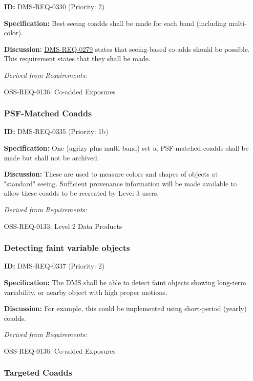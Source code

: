 \documentclass[SE,toc,lsstdraft]{lsstdoc}
\begin{document}
\label{DMS-REQ-0330}
\textbf{ID:} DMS-REQ-0330 (Priority: 2)

\textbf{Specification:} Best seeing coadds shall be made for each band (including multi-color).

\textbf{Discussion:} \hyperref[DMS-REQ-0279]{DMS-REQ-0279} states that seeing-based co-adds should be possible. This requirement states that they shall be made.

\emph{Derived from Requirements:}

OSS-REQ-0136:
Co-added Exposures \newline

\subsubsection{PSF-Matched Coadds}

\label{DMS-REQ-0335}
\textbf{ID:} DMS-REQ-0335 (Priority: 1b)

\textbf{Specification:} One (ugrizy plus multi-band) set of PSF-matched coadds shall be made but shall not be archived.

\textbf{Discussion:} These are used to measure colors and shapes of objects at "standard" seeing. Sufficient provenance information will be made available to allow these coadds to be recreated by Level 3 users.

\emph{Derived from Requirements:}

OSS-REQ-0133:
Level 2 Data Products \newline

\subsubsection{Detecting faint variable objects}

\label{DMS-REQ-0337}
\textbf{ID:} DMS-REQ-0337 (Priority: 2)

\textbf{Specification: }The DMS shall be able to detect faint objects showing long-term variability, or nearby object with high proper motions.

\textbf{Discussion:} For example, this could be implemented using short-period (yearly) coadds.

\emph{Derived from Requirements:}

OSS-REQ-0136:
Co-added Exposures \newline

\subsubsection{Targeted Coadds}
\end{document}
